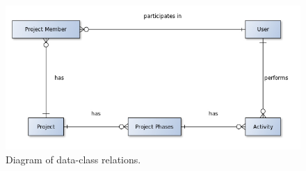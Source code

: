 \begin{figure}
	\centering
	\includegraphics[width=\textwidth]{./content/pictures/data-diagram.jpg}
	\caption[Diagram of data-class relations.]{Diagram of data-class relations.}
	\label{fig:data-diagram}
\end{figure}

